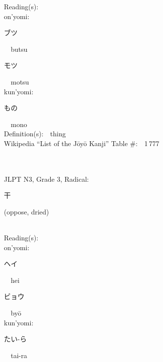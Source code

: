 \begin{multicols}{2}
Reading(s):\ \ \\
{\hspace*{1em}}on'yomi:\ \ \\
{\hspace*{2em}}{\begin{CJK}{UTF8}{min} ブツ \end{CJK}}\ \ butsu\ \ \\
{\hspace*{2em}}{\begin{CJK}{UTF8}{min} モツ \end{CJK}}\ \ motsu\ \ \\
{\hspace*{1em}}kun'yomi:\ \ \\
{\hspace*{2em}}{\begin{CJK}{UTF8}{min} もの \end{CJK}}\ \ mono\ \ \\
Definition(s):\ \ thing \\
Wikipedia ``List of the J\=oy\=o Kanji'' Table \#:\ \ 1\,777 \\
\ \ \\
{\fontsize{34pt}{40pt}  }\ \ \\  %
{JLPT N3, Grade 3, Radical:\ \ {\begin{CJK}{UTF8}{min} 干 \end{CJK}} (oppose, dried) } \\
Reading(s):\ \ \\
{\hspace*{1em}}on'yomi:\ \ \\
{\hspace*{2em}}{\begin{CJK}{UTF8}{min} ヘイ \end{CJK}}\ \ hei\ \ \\
{\hspace*{2em}}{\begin{CJK}{UTF8}{min} ビョウ \end{CJK}}\ \ by\=o\ \ \\
{\hspace*{1em}}kun'yomi:\ \ \\
{\hspace*{2em}}{\begin{CJK}{UTF8}{min} たい-ら \end{CJK}}\ \ tai-ra\ \ \\

\end{multicols}
